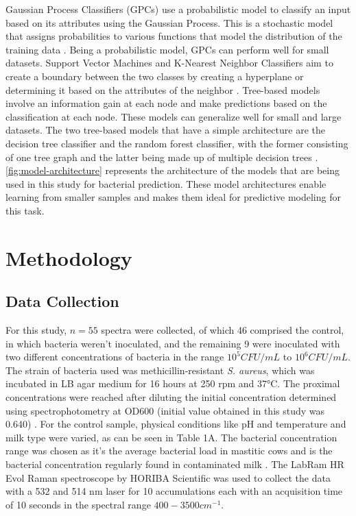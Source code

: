 \noindent Gaussian Process Classifiers (GPCs) use a probabilistic model to classify an input based on its attributes using the Gaussian Process. This is a stochastic model that assigns probabilities to various functions that model the distribution of the training data \cite{Goertler2019DistillGP}. Being a probabilistic model, GPCs can perform well for small datasets. Support Vector Machines and K-Nearest Neighbor Classifiers aim to create a boundary between the two classes by creating a hyperplane or determining it based on the attributes of the neighbor \cite{MITSVM,SciDirectKNN}. Tree-based models involve an information gain at each node and make predictions based on the classification at each node. These models can generalize well for small and large datasets. The two tree-based models that have a simple architecture are the decision tree classifier and the random forest classifier, with the former consisting of one tree graph and the latter being made up of multiple decision trees \cite{MediumTreeML}. \\ 

\noindent \autoref{fig:model-architecture} represents the architecture of the models that are being used in this study for bacterial prediction. These model architectures enable learning from smaller samples and makes them ideal for predictive modeling for this task.

\section{Methodology} \label{sec:desc}

\subsection{Data Collection}

For this study, $n=55$ spectra were collected, of which 46 comprised the control, in which bacteria weren’t inoculated, and the remaining 9 were inoculated with two different concentrations of bacteria in the range $10^5 CFU/mL$ to $10^6 CFU/mL$. The strain of bacteria used was methicillin-resistant \textit{S. aureus}, which was incubated in LB agar medium for 16 hours at 250 rpm and 37°C. The proximal concentrations were reached after diluting the initial concentration determined using spectrophotometry at OD600 (initial value obtained in this study was 0.640) \cite{Yang2013_srep01863}.  For the control sample, physical conditions like pH and temperature and milk type were varied, as can be seen in Table 1A. The bacterial concentration range was chosen as it's the average bacterial load in mastitic cows and is the bacterial concentration regularly found in contaminated milk \cite{doVale2023mastitis}. The LabRam HR Evol Raman spectroscope by HORIBA Scientific was used to collect the data with a 532 and 514 nm laser for 10 accumulations each with an acquisition time of 10 seconds in the spectral range $400-3500 cm^{-1}$. 


